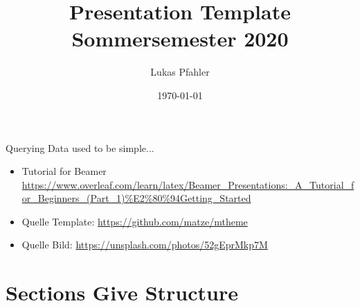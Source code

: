 \documentclass[aspectratio=169,10pt]{beamer}
\title{Presentation Template Sommersemester 2020}
\author{Lukas Pfahler}
\institute{TU Dortmund University - Department of Computer Science}
\date{\today}
\begin{document}
\maketitle

\begin{frame}[t,fragile]{Querying Data used to be simple...}
  \begin{itemize}
      \item Tutorial for Beamer \url{https://www.overleaf.com/learn/latex/Beamer_Presentations:_A_Tutorial_for_Beginners_(Part_1)%E2%80%94Getting_Started}
      \item Quelle Template: \url{https://github.com/matze/mtheme}
      \item Quelle Bild: \url{https://unsplash.com/photos/52gEprMkp7M}
  \end{itemize}
\end{frame}

\section{Sections Give Structure}
\end{document}

